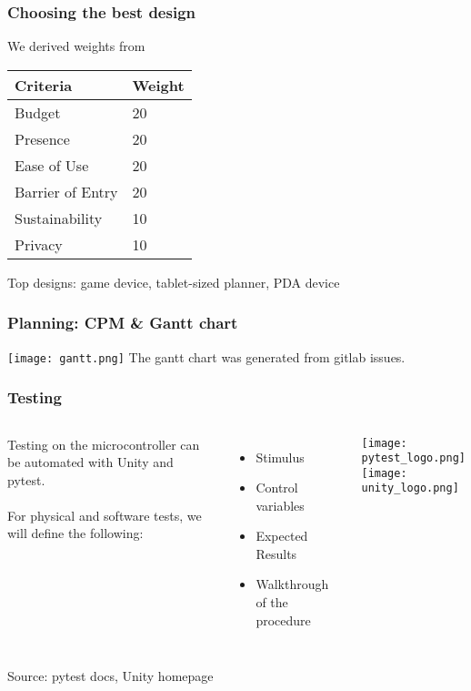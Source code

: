 \documentclass{beamer}
\begin{document}
\begin{frame}
  \frametitle{Choosing the best design}
  We derived weights from
  \begin{longtable}[]{@{}ll@{}}
  \toprule
  Criteria & Weight \\
  \midrule
  \endhead
  Budget & 20 \\
  Presence & 20 \\
  Ease of Use & 20 \\
  Barrier of Entry & 20 \\
  Sustainability & 10 \\
  Privacy & 10 \\
  \bottomrule
  \end{longtable}

  Top designs: game device, tablet-sized planner, PDA device

\end{frame}

\begin{frame}
  \frametitle{Planning: CPM \& Gantt chart}
  \texttt{[image: gantt.png]}
  The gantt chart was generated from gitlab issues.

\end{frame}

\begin{frame}
  \frametitle{Testing}

  \begin{columns}
    Testing on the microcontroller can be automated with Unity and pytest.
    \\~\\
    For physical and software tests, we will define the following:
    \begin{itemize}
      \item Stimulus
      \item Control variables
      \item Expected Results
      \item Walkthrough of the procedure
    \end{itemize}

    \texttt{[image: pytest\_logo.png]} \\
    \texttt{[image: unity\_logo.png]}

  \end{columns}
  \hfill {\tiny Source: pytest docs, Unity homepage}
\end{frame}
\end{document}
